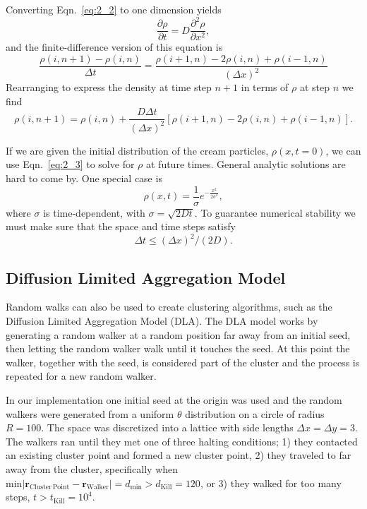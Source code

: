 \documentclass[notitlepage,aps,prd,nofootinbib]{revtex4-1}
\begin{document}
Converting Eqn.~\eqref{eq:2_2} to one dimension yields
\begin{equation}
	\frac{\partial\rho}{\partial t} = D\frac{\partial^{2}\rho}{\partial x^{2}},
\end{equation}
and the finite-difference version of this equation is 
\begin{equation}
	\frac{\rho(i, n+1) - \rho(i, n)}{\Delta t} = \frac{\rho(i+1, n) - 2\rho(i, n) + \rho(i-1, n)}{(\Delta x)^{2}}
\end{equation}
Rearranging to express the density at time step $n+1$ in terms of $\rho$ at step $n$ we find
\begin{equation} \label{eq:2_3}
	\rho(i, n+1) = \rho(i, n) + \frac{D\Delta t}{(\Delta x)^{2}}[\rho(i+1, n) - 2\rho(i, n) + \rho(i-1, n)]. 
\end{equation}

If we are given the initial distribution of the cream particles, $\rho(x, t=0)$, we can use Eqn.~\eqref{eq:2_3} to solve for $\rho$ at future times. General analytic solutions are hard to come by. One special case is 
\begin{equation}
	\rho(x, t) = \frac{1}{\sigma}e^{-\frac{x^{2}}{2\sigma^{2}}},
\end{equation}
where $\sigma$ is time-dependent, with $\sigma = \sqrt{2Dt}$. To guarantee numerical stability we must make sure that the space and time steps satisfy
\begin{equation}
	\Delta t \leq (\Delta x)^{2}/(2D).
\end{equation}

\subsection{Diffusion Limited Aggregation Model}
\label{subsec:theory_3}
Random walks can also be used to create clustering algorithms, such as the Diffusion Limited Aggregation Model (DLA). The DLA model works by generating a random walker at a random position far away from an initial seed, then letting the random walker walk until it touches the seed. At this point the walker, together with the seed, is considered part of the cluster and the process is repeated for a new random walker.

In our implementation one initial seed at the origin was used and the random walkers were generated from a uniform $\theta$ distribution on a circle of radius $R = 100$. The space was discretized into a lattice with side lengths $\Delta x = \Delta y = 3$. The walkers ran until they met one of three halting conditions; 1) they contacted an existing cluster point and formed a new cluster point, 2) they traveled to far away from the cluster, specifically when $\mathrm{min}\left|\mathbf{r}_{\mathrm{Cluster\,Point}} - \mathbf{r}_{\mathrm{Walker}}\right| = d_{\mathrm{min}} > d_{\mathrm{Kill}} = 120$, or 3) they walked for too many steps, $t > t_{\mathrm{Kill}} = 10^{4}$.
\end{document}

